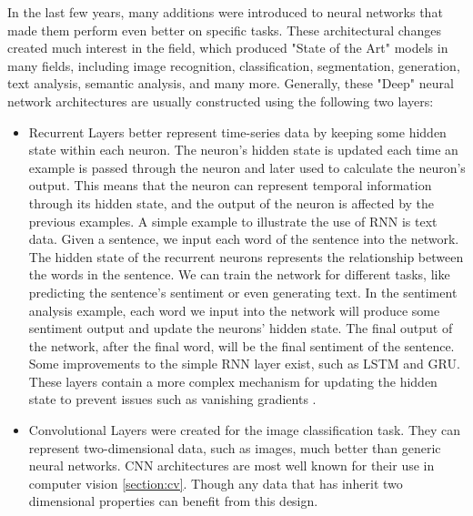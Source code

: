 \documentclass[../main.tex]{subfiles}
\begin{document}
In the last few years, many additions were introduced to neural networks that made them perform even better on specific tasks.
These architectural changes created much interest in the field, which produced  "State of the Art" models in many fields, including image recognition,
classification, segmentation, generation, text analysis, semantic analysis, and many more. Generally, these "Deep" neural network architectures
are usually constructed using the following two layers:

\begin{samepage}
\begin{itemize}
    \item Recurrent Layers better represent time-series data by keeping some hidden state within each neuron. The neuron's hidden state is updated
        each time an example is passed through the neuron and later used to calculate the neuron's output.
        This means that the neuron can represent temporal information through its hidden state,
        and the output of the neuron is affected by the previous examples.
        A simple example to illustrate the use of RNN is text data. Given a sentence, we input each word of the sentence into the network.
        The hidden state of the recurrent neurons represents the relationship between the words in the sentence. We can train the network for
        different tasks, like predicting the sentence's sentiment or even generating text. In the sentiment analysis example,
        each word we input into the network will produce some sentiment output and update the neurons' hidden state. The final output of the network,
        after the final word, will be the final sentiment of the sentence. Some improvements to the simple RNN layer exist,
        such as LSTM \cite{lstm} and GRU\cite{GRU}. These layers contain a more complex mechanism for
        updating the hidden state to prevent issues such as 
        vanishing gradients \cite{vanishing-gradients}. 
    \item Convolutional Layers were created for the image classification task. They can represent two-dimensional data, such as images,
        much better than generic neural networks. CNN architectures are most well known for their use in computer vision \ref{section:cv}.
        Though any data that has inherit two dimensional properties can benefit from this design. 
\end{itemize}
\end{samepage}
\end{document}
